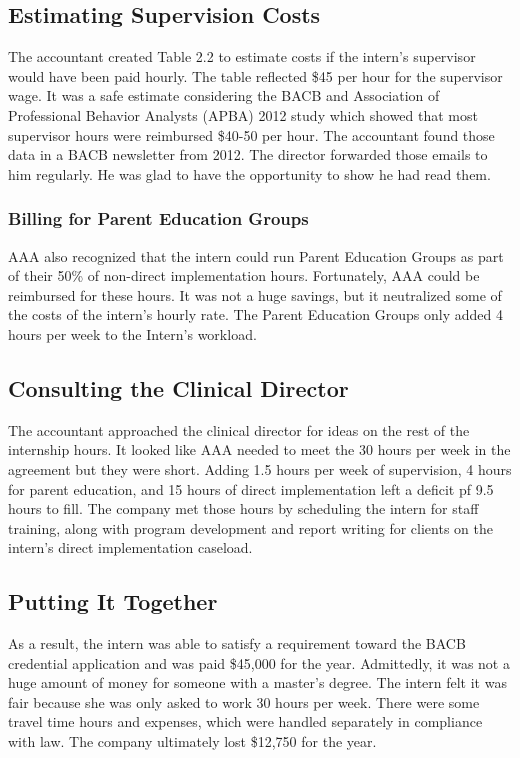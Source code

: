 \subsection{Estimating Supervision Costs}
The accountant created Table 2.2 to estimate costs if the intern's supervisor would have been paid hourly. The table reflected \$45 per hour for the supervisor wage. It was a safe estimate considering the BACB\textregistered{} and Association of Professional Behavior Analysts (APBA) 2012 study which showed that most supervisor hours were reimbursed \$40-50 per hour. The accountant found those data in a BACB\textregistered{} newsletter from 2012. The director forwarded those emails to him regularly. He was glad to have the opportunity to show he had read them. 

\subsubsection{Billing for Parent Education Groups}
AAA also recognized that the intern could run Parent Education Groups as part of their 50\% of non-direct implementation hours. Fortunately, AAA could be reimbursed for these hours. It was not a huge savings, but it neutralized some of the costs of the intern's hourly rate. The Parent Education Groups only added 4 hours per week to the Intern's workload. 

\subsection{Consulting the Clinical Director}
The accountant approached the clinical director for ideas on the rest of the internship hours. It looked like AAA needed to meet the 30 hours per week in the agreement but they were short. Adding 1.5 hours per week of supervision, 4 hours for parent education, and 15 hours of direct implementation left a deficit pf 9.5 hours to fill. The company met those hours by scheduling the intern for staff training, along with program development and report writing for clients on the intern's direct implementation caseload.

\subsection{Putting It Together}
As a result, the intern was able to satisfy a requirement toward the BACB\textregistered{} credential application and was paid \$45,000 for the year. Admittedly, it was not a huge amount of money for someone with a master's degree. The intern felt it was fair because she was only asked to work 30 hours per week. There were some travel time hours and expenses, which were handled separately in compliance with law. The company ultimately lost \$12,750 for the year.

